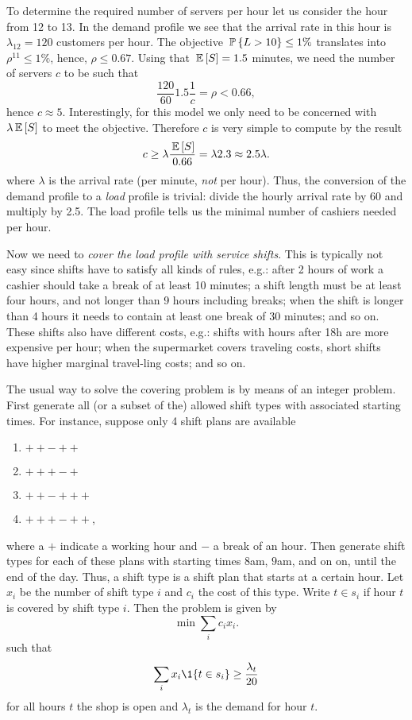 To determine the required number of servers per hour let us consider
the hour from 12 to 13. In the demand profile we see that the arrival
rate in this hour is $\lambda_{12}= 120$ customers per hour. The
objective $\P{L>10}\leq 1\%$ translates into $\rho^{11}\leq 1\%$,
hence, $\rho \leq 0.67$. Using that $\E{S}=1.5$ minutes, we need the
number of servers $c$ to be such that
\begin{equation*}
  \frac{120}{60} 1.5 \frac 1 c = \rho < 0.66,
\end{equation*}
hence $c\approx5$.  Interestingly, for this model we only need to be
concerned with $\lambda \E S$ to meet the objective. Therefore $c$ is
very simple to compute by the result
\begin{equation*}
  c \geq \lambda \frac{\E S}{0.66}  = \lambda 2.3 \approx 2.5 \lambda.
\end{equation*}
where $\lambda$ is the arrival rate (per minute, \emph{not} per hour).
Thus, the conversion of the demand profile to a \emph{load} profile is
trivial: divide the hourly arrival rate by $60$ and multiply by
2.5. The load profile tells us the minimal number of cashiers needed
per hour.

Now we need to \emph{cover the load profile with service shifts}. This
is typically not easy since shifts have to satisfy all kinds of rules,
e.g.: after 2 hours of work a cashier should take a break of at least
10 minutes; a shift length must be at least four hours, and not longer
than 9 hours including breaks; when the shift is longer than 4 hours
it needs to contain at least one break of 30 minutes; and so on. These
shifts also have different costs, e.g.: shifts with hours after 18h
are more expensive per hour; when the supermarket covers traveling
costs, short shifts have higher marginal travel-ling costs; and so on.

The usual way to solve the covering problem is by means of an integer
problem. First generate all (or a subset of the) allowed shift types
with associated starting times. For instance, suppose only 4 shift
plans are available
\begin{enumerate}
\item $++-++$
\item $+++-+$
\item $++-+++$
\item $+++-++$,
\end{enumerate}
where a $+$ indicate a working hour and $-$ a break of an hour. Then
generate shift types for each of these plans with starting times
$8$am, $9$am, and on on, until the end of the day. Thus, a shift type
is a shift plan that starts at a certain hour. Let $x_i$ be the number
of shift type $i$ and $c_i$ the cost of this type. Write $t\in s_i$ if
hour $t$ is covered by shift type $i$.  Then the problem is given by
\begin{equation*}
  \min \sum_i c_i x_i.
\end{equation*}
such that 
\begin{equation*}
  \sum_i x_i \1{t \in s_i} \geq \frac{\lambda_t}{20}
\end{equation*}
for all hours $t$ the shop is open and $\lambda_t$ is the demand for
hour $t$.

